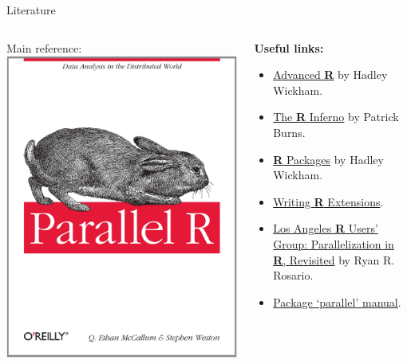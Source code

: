 \documentclass[aspectratio=169]{beamer}\usepackage[]{graphicx}\usepackage[]{color}
\begin{document}
\begin{frame}{Literature}
  \begin{columns}[T]
    \begin{column}{.48\textwidth}
        Main reference: \\
        \includegraphics*[height=.8\textheight]{figure/Parallel_R.jpg} 
    \end{column}
    \begin{column}{.48\textwidth}
        \textbf{Useful links:}
        \begin{itemize}
          \item \href{http://adv-r.had.co.nz/}{Advanced \textbf{R}} by Hadley Wickham.
          \item \href{http://www.burns-stat.com/documents/books/the-r-inferno/}{The \textbf{R} Inferno} by Patrick Burns.
          \item \href{http://r-pkgs.had.co.nz/}{\textbf{R} Packages} by Hadley Wickham.
          \item \href{http://cran.r-project.org/doc/manuals/r-release/R-exts.html}{Writing \textbf{R} Extensions}.
          \item \href{http://www.bytemining.com/files/talks/larug/hpc2012/HPC_in_R_rev2012.pdf}{Los Angeles \textbf{R} Users’ Group: Parallelization in \textbf{R}, Revisited} by Ryan R. Rosario.
          \item \href{https://stat.ethz.ch/R-manual/R-devel/library/parallel/doc/parallel.pdf}{Package ‘parallel’ manual}.
        \end{itemize}
    \end{column}
  \end{columns}
\end{frame}
\end{document}
